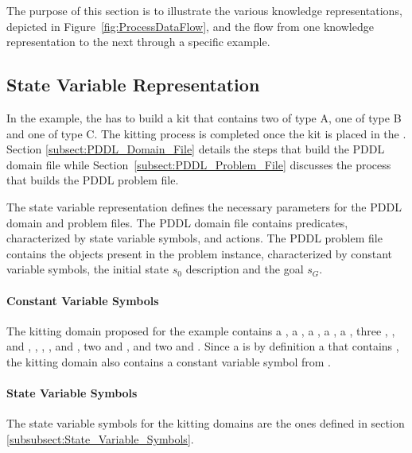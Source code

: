 The purpose of this section is to illustrate the various knowledge representations, depicted in Figure~\ref{fig:ProcessDataFlow}, and the flow from one knowledge representation to the next through a specific example.

\subsection{State Variable Representation}

In the example, the  has to build a kit that contains two  of type A, one  of type B and one  of type C. The kitting process is completed once the kit is placed in the . Section \ref{subsect:PDDL_Domain_File} details the steps that build the PDDL domain file while Section~\ref{subsect:PDDL_Problem_File} discusses the process that builds the PDDL problem file.

The state variable representation defines the necessary parameters for the PDDL domain and problem files. The PDDL domain file contains predicates, characterized by state variable symbols, and actions. The PDDL problem file contains the objects present in the problem instance, characterized by constant variable symbols, the initial state $s_0$ description and the goal $s_G$.



\paragraph{Constant Variable Symbols}
The kitting domain proposed for the example contains a  , a  , a  , a  , a  , three  , , and ,  , , , and , two   and , and two    and . Since a  is by definition a  that contains , the kitting domain also contains a constant variable symbol  from .

\paragraph{State Variable Symbols}
The state variable symbols for the kitting domains are the ones defined in section \ref{subsubsect:State_Variable_Symbols}.

